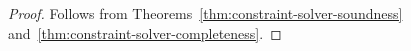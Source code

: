 \begin{proof}

Follows from Theorems~\ref{thm:constraint-solver-soundness} and~\ref{thm:constraint-solver-completeness}.

% 
% 
% 
% 
% 
\end{proof}

